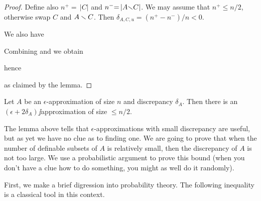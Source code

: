\documentclass[sputnik.tex]{subfiles}
\begin{document}
\begin{proof}

Define also $n^+{=}\,|C|$ and  $n^-{=}\,|A{\smallsetminus}C|$.
We may assume that $n^+\le n/2$, otherwise swap $C$ and $A\smallsetminus C$.
Then $\delta_{A,C,u}=(n^+-n^-)/n<0$.




We also have 




Combining  and  we obtain\smallskip

\smallskip

hence\smallskip

\smallskip

as claimed by the lemma.
\end{proof}

\begin{corollary}
Let $A$ be an $\epsilon$-approximation of size $n$ and discrepancy $\delta_A$.
Then there is an $(\epsilon+2\delta_A)\jj$approximation of size $\le n/2$.
\end{corollary}

The lemma above tells that $\epsilon$-approximations with small discrepancy are useful, but as yet we have no clue as to finding one.
We are going to prove that when the number of definable subsets of $A$ is relatively small, then the discrepancy of $A$ is not too large.
We use a probabilistic argument to prove this bound (when you don't have a clue how to do something, you might as well do it randomly).

First, we make a brief digression into probability theory.
The following inequality is a classical tool in this context.
\end{document}
